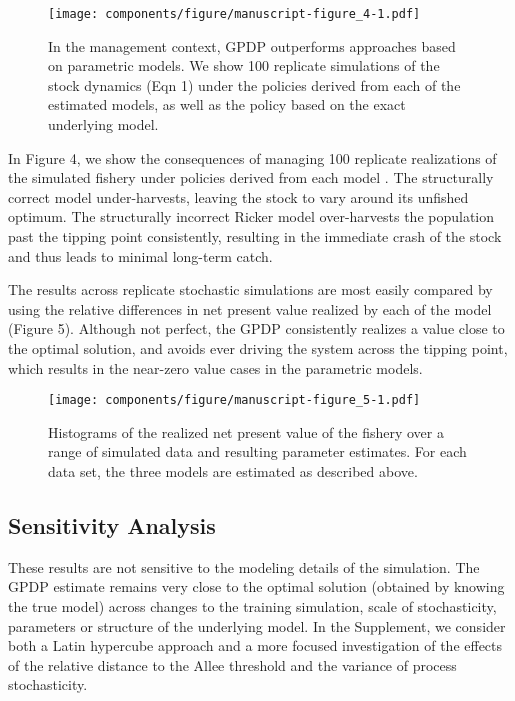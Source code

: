 \documentclass[author-year, 12pt,review]{components/elsarticle} %
\makeatletter
\def\maxwidth{\ifdim\Gin@nat@width>\linewidth\linewidth
\else\Gin@nat@width\fi}
\let\Oldincludegraphics\includegraphics
\renewcommand{\includegraphics}[1]{\Oldincludegraphics[width=\maxwidth]{#1}}
\makeatother
\begin{document}
\begin{figure}[htbp]
\centering
\texttt{[image: components/figure/manuscript-figure\_4-1.pdf]}
\caption{In the management context, GPDP outperforms approaches based on
parametric models. We show 100 replicate simulations of the stock
dynamics (Eqn 1) under the policies derived from each of the estimated
models, as well as the policy based on the exact underlying model.}
\end{figure}

In Figure 4, we show the consequences of managing 100 replicate
realizations of the simulated fishery under policies derived from each
model . The structurally correct model under-harvests, leaving the stock
to vary around its unfished optimum. The structurally incorrect Ricker
model over-harvests the population past the tipping point consistently,
resulting in the immediate crash of the stock and thus leads to minimal
long-term catch.

The results across replicate stochastic simulations are most easily
compared by using the relative differences in net present value realized
by each of the model (Figure 5). Although not perfect, the GPDP
consistently realizes a value close to the optimal solution, and avoids
ever driving the system across the tipping point, which results in the
near-zero value cases in the parametric models.

\begin{figure}[htbp]
\centering
\texttt{[image: components/figure/manuscript-figure\_5-1.pdf]}
\caption{Histograms of the realized net present value of the fishery
over a range of simulated data and resulting parameter estimates. For
each data set, the three models are estimated as described above.}
\end{figure}

\subsection{Sensitivity Analysis}\label{sensitivity-analysis}

These results are not sensitive to the modeling details of the
simulation. The GPDP estimate remains very close to the optimal solution
(obtained by knowing the true model) across changes to the training
simulation, scale of stochasticity, parameters or structure of the
underlying model. In the Supplement, we consider both a Latin hypercube
approach and a more focused investigation of the effects of the relative
distance to the Allee threshold and the variance of process
stochasticity.
\end{document}
